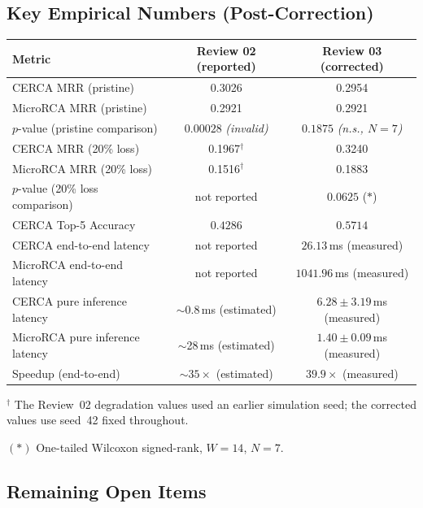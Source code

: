 \documentclass[11pt,a4paper]{article}
\newcommand{\tb}[1]{\textbf{#1}}
\begin{document}
\subsection{Key Empirical Numbers (Post-Correction)}

\begin{center}\small
\begin{tabular}{|L{6.0cm}|c|c|}
\hline
\tb{Metric} & \tb{Review 02 (reported)} & \tb{Review 03 (corrected)} \\ \hline
CERCA MRR (pristine) & 0.3026 & 0.2954 \\ \hline
MicroRCA MRR (pristine) & 0.2921 & 0.2921 \\ \hline
$p$-value (pristine comparison) & $0.00028$ \textit{(invalid)} & $0.1875$ \textit{(n.s., $N=7$)} \\ \hline
CERCA MRR (20\% loss) & 0.1967$^\dagger$ & 0.3240 \\ \hline
MicroRCA MRR (20\% loss) & 0.1516$^\dagger$ & 0.1883 \\ \hline
$p$-value (20\% loss comparison) & not reported & $0.0625$ ($*$) \\ \hline
CERCA Top-5 Accuracy & $0.4286$ & $\mathbf{0.5714}$ \\ \hline
CERCA end-to-end latency & not reported & $26.13$\,ms (measured) \\ \hline
MicroRCA end-to-end latency & not reported & $1041.96$\,ms (measured) \\ \hline
CERCA pure inference latency & $\sim$0.8\,ms (estimated) & $6.28\pm3.19$\,ms (measured) \\ \hline
MicroRCA pure inference latency & $\sim$28\,ms (estimated) & $1.40\pm0.09$\,ms (measured) \\ \hline
Speedup (end-to-end) & ${\sim}35\times$ (estimated) & $\mathbf{39.9\times}$ (measured) \\ \hline
\end{tabular}
\end{center}

{\footnotesize $^\dagger$ The Review~02 degradation values used an earlier simulation seed; the corrected values use seed~42 fixed throughout.\par
$(*)$ One-tailed Wilcoxon signed-rank, $W=14$, $N=7$.\par}

\subsection{Remaining Open Items}
\end{document}
